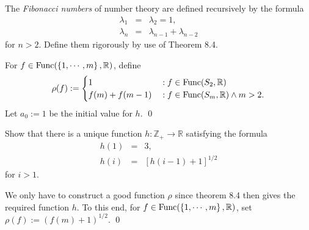 \documentclass[a4paper,12pt]{article}
\begin{document}
\begin{exe}
	The \textit{Fibonacci numbers} of number theory are defined recursively by the formula
	\begin{eqnarray*}
		\lambda_1 &=& \lambda_2 = 1,\\
		\lambda_{n}&=& \lambda_{n-1} + \lambda_{n-2}
	\end{eqnarray*}
	for \( n>2 \).
	Define them rigorously by use of Theorem 8.4.
\end{exe}
\begin{sol}%
	For
	\( f \in \mathrm{Func}(\left\{1, \cdots, m \right\},\mathbb{R}) \),
	define
	\begin{equation*}
		\rho(f):=	\begin{cases}
			1           & \;\mathrm{:}\;f\in \mathrm{Func}(S_2,\mathbb{R})             \\
			f(m)+f(m-1) & \;\mathrm{:}\;f\in \mathrm{Func}(S_m,\mathbb{R})\wedge m >2.
		\end{cases}
	\end{equation*}
	Let \( a_0:=1 \) be the initial value for \( h \).
	\qed\end{sol}

\begin{exe}
	Show that there is a unique function
	\( h:\mathbb{Z}_{+} \to \mathbb{R} \)
	satisfying the formula
	\begin{eqnarray*}
		h(1)&=&3,\\
		h(i)&=& \left[ h(i-1)+1 \right]^{1/2}
	\end{eqnarray*}
	for \( i>1 \).
\end{exe}
\begin{sol}
	We only have to construct a good function
	\( \rho \)
	since theorem 8.4 then gives the required function
	\( h \).
	To this end, for
	\( f \in \mathrm{Func}(\left\{1, \cdots, m \right\},\mathbb{R}) \),
	set
	\( \rho(f):=\left( f(m) + 1 \right)^{1/2} \).
	\qed\end{sol}
\end{document}
